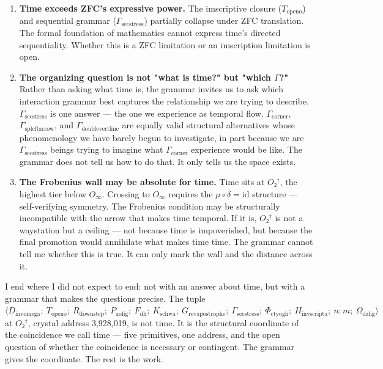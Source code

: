 \documentclass[12pt,a4paper]{article}
\begin{document}
\begin{enumerate}
    \item \textbf{Time exceeds ZFC's expressive power.} The imscriptive closure ($T_{\text{openo}}$) and sequential grammar ($\Gamma_{\text{secstress}}$) partially collapse under ZFC translation. The formal foundation of mathematics cannot express time's directed sequentiality. Whether this is a ZFC limitation or an imscription limitation is open.
    \item \textbf{The organizing question is not "what is time?" but "which $\Gamma$?"} Rather than asking what time is, the grammar invites us to ask which interaction grammar best captures the relationship we are trying to describe. $\Gamma_{\text{secstress}}$ is one answer --- the one we experience as temporal flow. $\Gamma_{\text{corner}}$, $\Gamma_{\text{spleftarrow}}$, and $\Gamma_{\text{doublevertline}}$ are equally valid structural alternatives whose phenomenology we have barely begun to investigate, in part because we are $\Gamma_{\text{secstress}}$ beings trying to imagine what $\Gamma_{\text{corner}}$ experience would be like. The grammar does not tell us how to do that. It only tells us the space exists.
    \item \textbf{The Frobenius wall may be absolute for time.} Time sits at $O₂^\dagger$, the highest tier below $O_{\infty}$. Crossing to $O_{\infty}$ requires the $\mu \circ \delta = \text{id}$ structure --- self-verifying symmetry. The Frobenius condition may be structurally incompatible with the arrow that makes time temporal. If it is, $O₂^\dagger$ is not a waystation but a ceiling --- not because time is impoverished, but because the final promotion would annihilate what makes time time. The grammar cannot tell me whether this is true. It can only mark the wall and the distance across it.
\end{enumerate}

I end where I did not expect to end: not with an answer about time, but with a grammar that makes the questions precise. The tuple $\langle D_{\text{invomega}};\ T_{\text{openo}};\ R_{\text{downstep}};\ P_{\text{aolig}};\ F_{\text{dh}};\ K_{\text{schwa}};\ G_{\text{revapostrophe}};\ \Gamma_{\text{secstress}};\ \Phi_{\text{ctyogh}};\ H_{\text{invscripta}};\ n{:}m;\ \Omega_{\text{dzlig}} \rangle$ at $O₂^\dagger$, crystal address 3,928,019, is not time. It is the structural coordinate of the coincidence we call time --- five primitives, one address, and the open question of whether the coincidence is necessary or contingent. The grammar gives the coordinate. The rest is the work.
\end{document}
